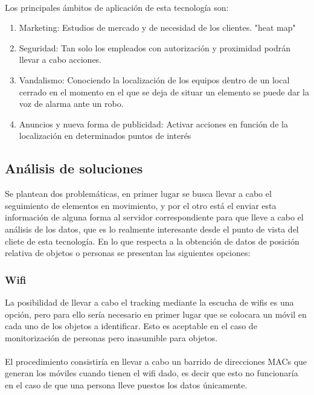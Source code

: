\documentclass[a4paper ,12pt, onecolumn]{article}
\begin{document}
        \paragraph{}
        Los principales ámbitos de aplicación de esta tecnología son:
        \begin{enumerate}
            \item Marketing: Estudios de mercado y de necesidad de los clientes. "heat map"
            \item Seguridad: Tan solo los empleados con autorización y proximidad podrán llevar a cabo acciones.
            \item Vandalismo: Conociendo la localización de los equipos dentro de un local cerrado en el momento 
            en el que se deja de situar un elemento se puede dar la voz de alarma ante un robo.
            \item Anuncios y nueva forma de publicidad: Activar acciones en función de la localización en determinados puntos de interés
        \end{enumerate}
    \subsection{Análisis de soluciones}
        Se plantean dos problemáticas, en primer lugar se busca llevar a cabo el seguimiento de elementos en movimiento, y por el otro 
        está el enviar esta información de alguna forma al servidor correspondiente para que lleve a cabo el análisis de los datos, que 
        es lo realmente interesante desde el punto de vista del cliete de esta tecnología.
        En lo que respecta a la obtención de datos de posición relativa de objetos o personas se presentan las siguientes opciones:
        \subsubsection {Wifi}
            La posibilidad de llevar a cabo el tracking mediante la escucha de wifis es una opción, pero para ello sería
            necesario en primer lugar que se colocara un móvil en cada uno de los objetos a identificar. Esto es aceptable 
            en el caso de monitorización de personas pero inasumible para objetos.
            \paragraph{}
            El procedimiento consistiría en llevar a cabo un barrido de direcciones MACs que generan los móviles cuando tienen el wifi dado,
            es decir que esto no funcionaría en el caso de que una persona lleve puestos los datos únicamente.
\end{document}
